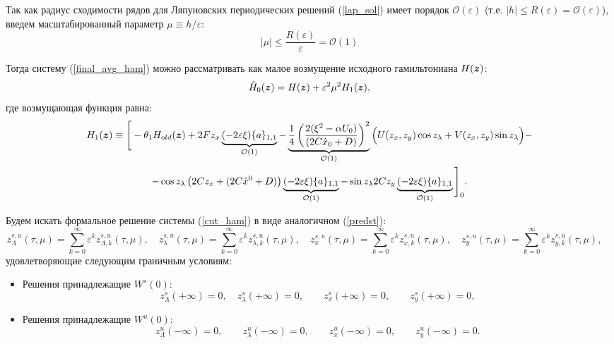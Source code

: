 Так как радиус сходимости рядов для Ляпуновских периодических решений (\ref{lap_sol}) имеет порядок $\mathcal{O}(\varepsilon)$ (т.е. $|h| \le R(\varepsilon) = \mathcal{O}(\varepsilon)$), введем масштабированный параметр $\mu \equiv h/\varepsilon$:
$$|\mu| \le \frac{R(\varepsilon)}{\varepsilon} = \mathcal{O}(1)$$

Тогда систему (\ref{final_avg_ham}) можно рассматривать как малое возмущение исходного гамильтониана $H(\boldsymbol{z})$:
\begin{equation}
\hat H_0(\boldsymbol{z}) = H(\boldsymbol{z}) + \varepsilon^2 \mu^2 H_1(\boldsymbol{z}),
\label{cut_ham}
\end{equation}
где возмущающая функция равна:
\begin{multline*}
H_1(\boldsymbol{z}) \equiv \Bigg[ -\theta_1 H_{old}(\boldsymbol{z}) + 2F z_x \underbrace{(-2 \varepsilon \xi ) \{a\}_{1,1}}_{\mathcal{O}(1)} - \underbrace{\frac{1}{4}\left( \frac{2(\xi^2-\alpha U_0)}{(2C \hat x_0 +  D)} \right)^2}_{\mathcal{O}(1)}\Big( 
        U(z_x,z_y) \cos z_\lambda + 
        V(z_x,z_y) \sin z_\lambda \Big) - \\
    - \cos z_\lambda
        \left(2C z_x +(2C \hat x^0 +  D) \right) \underbrace{(-2 \varepsilon \xi ) \{a\}_{1,1}}_{\mathcal{O}(1)}
    - \sin z_\lambda
        2C z_y \underbrace{(-2 \varepsilon \xi ) \{a\}_{1,1}}_{\mathcal{O}(1)} \Bigg]_0.
\end{multline*}

Будем искать формальное решение системы (\ref{cut_ham}) в виде аналогичном (\ref{predst}):
\begingroup
\small
\begin{equation}
z_{\Lambda}^{s,u}(\tau, \mu) = \sum_{k=0}^\infty \varepsilon^k z_{\Lambda,k}^{s,u}(\tau, \mu),\quad
z_\lambda^{s,u}(\tau, \mu) = \sum_{k=0}^\infty \varepsilon^k z_{\lambda,k}^{s,u}(\tau, \mu),\quad
z_x^{s,u}(\tau, \mu) =       \sum_{k=0}^\infty \varepsilon^k z_{x,k}^{s,u}(\tau, \mu),\quad
z_y^{s,u}(\tau, \mu) =       \sum_{k=0}^\infty \varepsilon^k z_{y,k}^{s,u}(\tau, \mu),\quad
\label{predst_h}
\end{equation}
\endgroup
удовлетворяющие следующим граничным условиям:
\begin{itemize}
\item Решения принадлежащие $W^s(0)$:
\begin{equation*}
        z_\Lambda^{s}(+ \infty) = 0, \quad
        z_\lambda^{s}(+ \infty) = 0,\qquad
        z_x^{s}(+ \infty) = 0, \qquad
        z_y^{s}(+ \infty) = 0,
    \label{border_h}
\end{equation*}
\item Решения принадлежащие $W^u(0)$:
\begin{equation*}
        z_\Lambda^{u}(- \infty) = 0, \qquad
        z_\lambda^{u}(- \infty) = 0,\qquad
        z_x^{u}(- \infty) = 0, \qquad
        z_y^{u}(- \infty) = 0.
\end{equation*}
\end{itemize}

